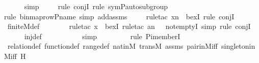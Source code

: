 \begin{isabellebody}
\ \ \ \ \isamarkupfalse%
\ simp\isanewline
\ \ \ \ \isamarkupfalse%
{\isacharparenleft}{\kern0pt}rule\ conjI{\isacharcomma}{\kern0pt}\ rule\ sym{\isacharunderscore}{\kern0pt}P{\isacharunderscore}{\kern0pt}auto{\isacharunderscore}{\kern0pt}subgroup{\isacharparenright}{\kern0pt}\isanewline
\ \ \ \ \ \isamarkupfalse%
{\isacharparenleft}{\kern0pt}rule\ binmap{\isacharunderscore}{\kern0pt}row{\isacharprime}{\kern0pt}{\isacharunderscore}{\kern0pt}P{\isacharunderscore}{\kern0pt}name{\isacharcomma}{\kern0pt}\ simp\ add{\isacharcolon}{\kern0pt}assms{\isacharparenright}{\kern0pt}\isanewline
\ \ \ \ \isamarkupfalse%
{\isacharparenleft}{\kern0pt}rule{\isacharunderscore}{\kern0pt}tac\ x{\isacharequal}{\kern0pt}{\isachardoublequoteopen}{\isacharbraceleft}{\kern0pt}n{\isacharbraceright}{\kern0pt}{\isachardoublequoteclose}\ \ bexI{\isacharcomma}{\kern0pt}\ rule\ conjI{\isacharparenright}{\kern0pt}\isanewline
\ \ \ \ \isamarkupfalse%
\ finite{\isacharunderscore}{\kern0pt}M{\isacharunderscore}{\kern0pt}def\ \isanewline
\ \ \ \ \ \ \isamarkupfalse%
{\isacharparenleft}{\kern0pt}rule{\isacharunderscore}{\kern0pt}tac\ x{\isacharequal}{\kern0pt}{}\ \ bexI{\isacharcomma}{\kern0pt}\ rule{\isacharunderscore}{\kern0pt}tac\ a{\isacharequal}{\kern0pt}{\isachardoublequoteopen}{\isacharbraceleft}{\kern0pt}{\isacharless}{\kern0pt}n{\isacharcomma}{\kern0pt}\ {}{\isachargreater}{\kern0pt}{\isacharbraceright}{\kern0pt}{\isachardoublequoteclose}\ \ not{\isacharunderscore}{\kern0pt}emptyI{\isacharcomma}{\kern0pt}\ simp{\isacharcomma}{\kern0pt}\ rule\ conjI{\isacharparenright}{\kern0pt}\isanewline
\ \ \ \ \isamarkupfalse%
\ inj{\isacharunderscore}{\kern0pt}def\ \isanewline
\ \ \ \ \ \ \ \ \isamarkupfalse%
\ simp\isanewline
\ \ \ \ \ \ \ \ \isamarkupfalse%
{\isacharparenleft}{\kern0pt}rule\ Pi{\isacharunderscore}{\kern0pt}memberI{\isacharparenright}{\kern0pt}\isanewline
\ \ \ \ \isamarkupfalse%
\ relation{\isacharunderscore}{\kern0pt}def\ function{\isacharunderscore}{\kern0pt}def\ range{\isacharunderscore}{\kern0pt}def\ nat{\isacharunderscore}{\kern0pt}in{\isacharunderscore}{\kern0pt}M\ transM\ assms\ pair{\isacharunderscore}{\kern0pt}in{\isacharunderscore}{\kern0pt}M{\isacharunderscore}{\kern0pt}iff\ singleton{\isacharunderscore}{\kern0pt}in{\isacharunderscore}{\kern0pt}M{\isacharunderscore}{\kern0pt}iff\ H\isanewline
\ \ \ \ \isamarkupfalse%

\end{isabellebody}
